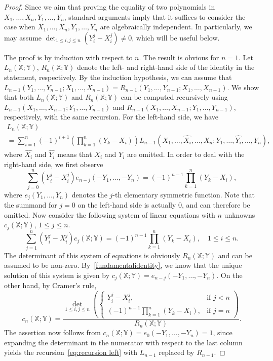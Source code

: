 \begin{proof}
Since we aim that proving the equality of two polynomials in $X_1,\ldots,X_n,\allowbreak Y_1,\ldots,Y_n$, standard arguments imply that it suffices to consider the case when $X_1,\ldots,X_n,\allowbreak Y_1,\ldots,Y_n$ are algebraically independent. In particularly, we may assume $\det_{1 \le i, j \le n} \left( Y_i^j - X_i^j \right) \not=0$, which will be useful below.

The proof is by induction with respect to $n$. The result is obvious for $n=1$. 
Let $L_n(\mathbb{X};\mathbb{Y})$, $R_n(\mathbb{X};\mathbb{Y})$ denote the left- and right-hand side of the identity in the statement, respectively. By the induction hypothesis, we can assume 
that $ L_{n-1}(Y_1,\ldots,Y_{n-1};X_1,\ldots,X_{n-1}) = R_{n-1}(Y_1,\ldots,Y_{n-1};X_1,\ldots,X_{n-1})$.
We show that both $L_n(\mathbb{X};\mathbb{Y})$ and $R_n(\mathbb{X};\mathbb{Y})$ can be computed recursively using 
$L_{n-1}(X_1,\ldots,X_{n-1};Y_1,\ldots,Y_{n-1})$ and $R_{n-1}(X_1,\ldots,X_{n-1};Y_1,\ldots,Y_{n-1})$, respectively, with the same recursion.
For the left-hand side, we have 
\begin{multline}
\label{eq:recursion left}
L_n(\mathbb{X};\mathbb{Y}) \\
=  \sum_{i=1}^{n} (-1)^{i+1}  \left( \prod_{k=1}^n (Y_k-X_i)  \right) 
L_{n-1}(X_1,\ldots,\widehat{X_i},\ldots,X_n;Y_1,\ldots,\widehat{Y_i},\ldots,Y_n),
\end{multline}
where $\widehat{X_i}$ and $\widehat{Y_i}$ means that $X_i$ and $Y_i$ are omitted.
In order to deal with the right-hand side, we first observe
\begin{equation}
\label{fundamentalidentity}
\sum_{j=0}^{n} (Y_i^j - X_i^j) e_{n-j}(-Y_1,\ldots,-Y_n) = (-1)^{n-1} \prod_{k=1}^{n} (Y_k-X_i),
\end{equation}
where $e_{j}(Y_1,\ldots,Y_n)$ denotes the $j$-th elementary symmetric function. Note that the summand for $j=0$ on the left-hand side is actually $0$, and can therefore be omitted.
Now consider the following system of linear equations with $n$ unknowns $c_j(\mathbb{X};\mathbb{Y})$, $1 \le j \le n$.
\[
\sum_{j=1}^{n} (Y_i^j - X_i^j)  c_j(\mathbb{X};\mathbb{Y})
= (-1)^{n-1} \prod_{k=1}^{n} (Y_k-X_i), \quad 1 \le i \le n.
\]
The determinant of this system of equations is obviously $R_n(\mathbb{X};\mathbb{Y})$ and can be assumed to be non-zero. By~\eqref{fundamentalidentity}, we know that the unique solution of this system is given by 
$
c_j(\mathbb{X};\mathbb{Y}) = e_{n-j}(-Y_1,\ldots,-Y_n).
$
On the other hand, by Cramer's rule, 
\[
c_n(\mathbb{X};\mathbb{Y}) = \frac{\det \limits_{1 \le i, j \le n} \left( \begin{cases}  Y_i^j - X_i^j, & \text{if $j<n$} \\
  (-1)^{n-1} \prod\limits_{k=1}^{n} (Y_k-X_i) , & \text{if $j=n$}  \end{cases} \right)}{R_n(\mathbb{X};\mathbb{Y})}.
\]
The assertion now follows from $c_n(\mathbb{X};\mathbb{Y}) = e_{0}(-Y_1,\ldots,-Y_n)=1$, since expanding the determinant in the numerator with respect to the last column yields the recursion~\eqref{eq:recursion left} with $L_{n-1}$ replaced by $R_{n-1}$.
\end{proof}


